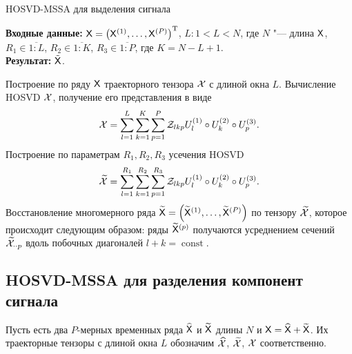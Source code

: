 \documentclass[specialist,
  substylefile=spbu_report.rtx,
subf,href,colorlinks=true, 12pt]{disser}
\theoremstyle{plain}
\theoremstyle{definition}
\theoremstyle{remark}
\newcommand{\Input}{\textbf{Входные данные: }}
\newcommand{\Output}{\textbf{Результат: }}
\begin{document}
\begin{algorithm}[!ht]
  \caption{HOSVD-MSSA для выделения сигнала}
  \label{alg:hosvd-mssa}
  \Input $\mathsf{X} = \left(\mathsf{X}^{(1)}, \ldots, \mathsf{X}^{(P)}\right)^{\mathrm{T}}$,
  $L: 1< L < N$, где $N$ "--- длина $\mathsf{X}$, $R_1 \in \overline{1:L}$,
  $R_2 \in \overline{1:K}$, $R_3 \in \overline{1:P}$, где $K = N-L+1$.\\
  \Output $\tilde{\mathsf{X}}$.
  \begin{algorithmic}[1]
    \State Построение по ряду $\mathsf{X}$ траекторного тензора $\mathcal{X}$ с длиной окна $L$.
    \State Вычисление HOSVD $\mathcal{X}$, получение его представления в виде
    \begin{equation}
      \mathcal{X} = \sum_{l=1}^{L} \sum_{k=1}^{K} \sum_{p=1}^{P} \mathcal{Z}_{lkp} U_l^{(1)}\circ U_k^{(2)} \circ U_p^{(3)}.
      \label{eq:hosvd-mssa}
    \end{equation}
    \State Построение по параметрам $R_1, R_2, R_3$ усечения HOSVD
    \[
      \widetilde{\mathcal{X}}=\sum_{l=1}^{R_1} \sum_{k=1}^{R_2} \sum_{p=1}^{R_3} \mathcal{Z}_{lkp} U_l^{(1)}\circ U_k^{(2)} \circ U_p^{(3)}.
    \]
    \State \label{step:hosvd-mssa-sep-restoration} Восстановление многомерного ряда $\widetilde{\mathsf{X}}=\left(\widetilde{\mathsf{X}}^{(1)}, \ldots, \widetilde{\mathsf{X}}^{(P)}\right)$ по тензору
    $\widetilde{\mathcal{X}}$, которое происходит следующим образом:
    ряды $\widetilde{\mathsf{X}}^{(p)}$ получаются усреднением сечений $\widetilde{\mathcal{X}}_{\cdot \cdot p}$ вдоль
    побочных диагоналей $l+k=\operatorname{const}$.
  \end{algorithmic}
\end{algorithm}

\subsection{HOSVD-MSSA для разделения компонент сигнала}\label{subsec:Tensor-MSSA-sep-method-description}
Пусть есть два $P$-мерных временных ряда $\widehat{\mathsf{X}}$ и $\widetilde{\mathsf{X}}$ длины $N$ и
$\mathsf{X} = \widehat{\mathsf{X}} + \widetilde{\mathsf{X}}$. Их траекторные тензоры с длиной окна $L$ обозначим
$\widehat{\mathcal{X}}$, $\widetilde{\mathcal{X}}$, $\mathcal{X}$ соответственно.
\end{document}
